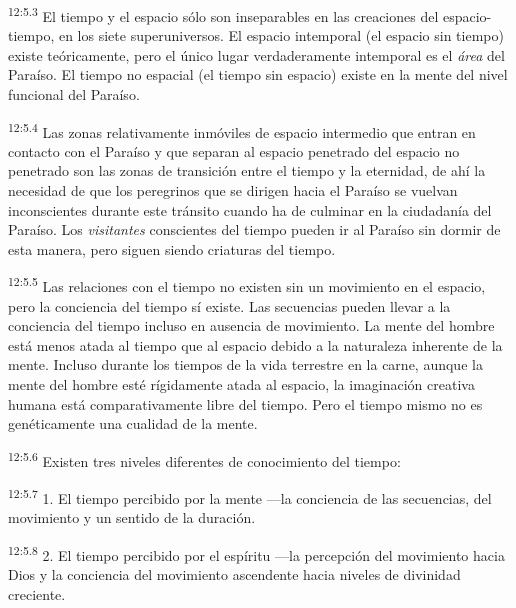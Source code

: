 \par
\textsuperscript{12:5.3} El tiempo y el espacio sólo son inseparables en las creaciones del espacio-tiempo, en los siete superuniversos. El espacio intemporal (el espacio sin tiempo) existe teóricamente, pero el único lugar verdaderamente intemporal es el \textit{área} del Paraíso. El tiempo no espacial (el tiempo sin espacio) existe en la mente del nivel funcional del Paraíso.

\par
\textsuperscript{12:5.4} Las zonas relativamente inmóviles de espacio intermedio que entran en contacto con el Paraíso y que separan al espacio penetrado del espacio no penetrado son las zonas de transición entre el tiempo y la eternidad, de ahí la necesidad de que los peregrinos que se dirigen hacia el Paraíso se vuelvan inconscientes durante este tránsito cuando ha de culminar en la ciudadanía del Paraíso. Los \textit{visitantes} conscientes del tiempo pueden ir al Paraíso sin dormir de esta manera, pero siguen siendo criaturas del tiempo.

\par
\textsuperscript{12:5.5} Las relaciones con el tiempo no existen sin un movimiento en el espacio, pero la conciencia del tiempo sí existe. Las secuencias pueden llevar a la conciencia del tiempo incluso en ausencia de movimiento. La mente del hombre está menos atada al tiempo que al espacio debido a la naturaleza inherente de la mente. Incluso durante los tiempos de la vida terrestre en la carne, aunque la mente del hombre esté rígidamente atada al espacio, la imaginación creativa humana está comparativamente libre del tiempo. Pero el tiempo mismo no es genéticamente una cualidad de la mente.

\par
\textsuperscript{12:5.6} Existen tres niveles diferentes de conocimiento del tiempo:

\par
\textsuperscript{12:5.7} 1. El tiempo percibido por la mente ---la conciencia de las secuencias, del movimiento y un sentido de la duración.

\par
\textsuperscript{12:5.8} 2. El tiempo percibido por el espíritu ---la percepción del movimiento hacia Dios y la conciencia del movimiento ascendente hacia niveles de divinidad creciente.

